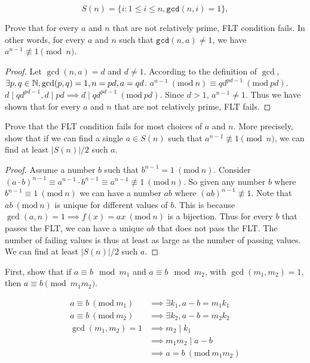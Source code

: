 \documentclass[11pt]{article}
\newcommand{\Mod}[1]{\ (\mathrm{mod}\ #1)}
\begin{document}
\newpage
{}

$$S(n) = \{i: 1 \leq i \leq n, \texttt{gcd}(n,i) = 1\},$$

\begin{Parts}
    \Part Prove that for every $a$ and $n$ that are not relatively prime, FLT condition fails. In other words, for every $a$ and $n$ such that $\texttt{gcd}(n,a) \neq 1$, we have $a^{n-1} \not\equiv 1 \pmod{n}$.
    \begin{Answer}
        \begin{proof}
            Let $\gcd(n,a)=d$ and $d \neq 1$. According to the definition of $\gcd$, $\exists p,q \in \mathbb{N}, \gcd(p,q) = 1, n = pd, a = qd$. 
            $a^{n-1} \Mod{n} \equiv qd^{pd-1} \Mod{pd}$. $d \mid qd^{pd-1}, d \mid pd \implies d \mid qd^{pd-1} \Mod{pd}$. Since $d > 1$, $a^{n-1} \neq 1$. 
            Thus we have shown that for every $a$ and $n$ that are not relatively prime, FLT fails. 
        \end{proof}
    \end{Answer}

    \Part Prove that the FLT condition fails for most choices of $a$ and $n$. More precisely, show that if we can find a single $a \in S(n)$ such that $a^{n-1} \not \equiv 1 \pmod{n}$, we can find at least $|S(n)|/2$ such $a$.
    \begin{Answer}
        \begin{proof}
            Assume a number $b$ such that $b^{n-1} = 1 \Mod{n}$. Consider $(a\cdot b)^{n-1} \equiv a^{n-1}\cdot b^{n-1} \equiv a^{n-1} \not \equiv 1 \Mod{n}$. So given any number $b$ where $b^{n-1} \equiv 1 \Mod{n}$ we can have
            a number $ab$ where $(ab)^{n-1} \not \equiv 1$. Note that $ab \Mod{n}$ is unique for different values of $b$. This is because $\gcd(a,n) = 1 \implies f(x) = ax \Mod{n}$ is a bijection. Thus for every $b$ that passes
            the FLT, we can have a unique $ab$ that does not pass the FLT. The number of failing values is thus at least as large as the number of passing values. We can find at least $|S(n)|/2$ such $a$. 
        \end{proof}
    \end{Answer}

    \Part First, show that if $a \equiv b \mod m_1$ and $a \equiv b \mod m_2$, with $\gcd(m_1, m_2)=1$, then $a \equiv b \pmod{m_1 m_2}$.
    \begin{Answer}
        \begin{align*}
            a \equiv b \Mod{m_1} &\implies \exists k_1, a - b = m_1k_1 \\
            a \equiv b \Mod{m_2} &\implies \exists k_2, a - b = m_2k_2 \\
               \gcd(m_1,m_2) = 1 &\implies m_2 \mid k_1 \\
                                 &\implies m_1m_2 \mid a - b \\
                                 &\implies a = b \Mod{m_1m_2}
        \end{align*}
    \end{Answer}
    

\end{Parts}
\end{document}
